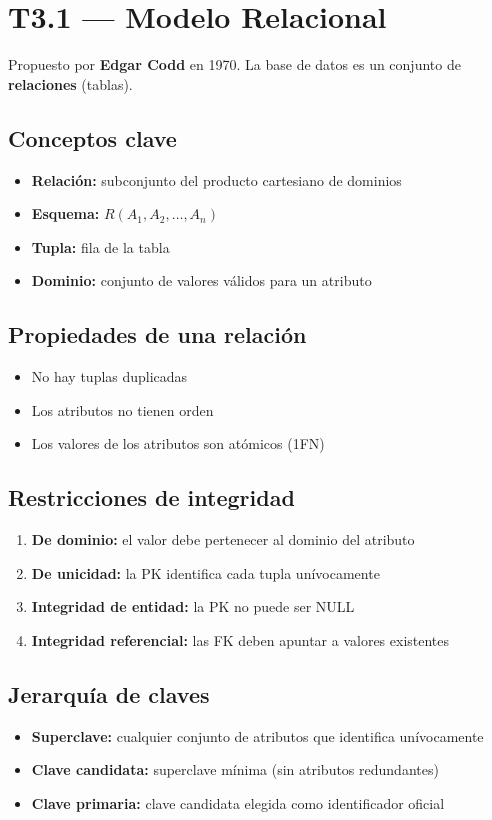 \documentclass[12pt, a4paper]{article}
\begin{document}
\section{T3.1 — Modelo Relacional}

Propuesto por \textbf{Edgar Codd} en 1970. La base de datos es un conjunto de \textbf{relaciones} (tablas).

\subsection{Conceptos clave}
\begin{itemize}
  \item \textbf{Relación:} subconjunto del producto cartesiano de dominios
  \item \textbf{Esquema:} $R(A_1, A_2, \ldots, A_n)$
  \item \textbf{Tupla:} fila de la tabla
  \item \textbf{Dominio:} conjunto de valores válidos para un atributo
\end{itemize}

\subsection{Propiedades de una relación}
\begin{itemize}
  \item No hay tuplas duplicadas
  \item Los atributos no tienen orden
  \item Los valores de los atributos son atómicos (1FN)
\end{itemize}

\subsection{Restricciones de integridad}
\begin{enumerate}
  \item \textbf{De dominio:} el valor debe pertenecer al dominio del atributo
  \item \textbf{De unicidad:} la PK identifica cada tupla unívocamente
  \item \textbf{Integridad de entidad:} la PK no puede ser NULL
  \item \textbf{Integridad referencial:} las FK deben apuntar a valores existentes
\end{enumerate}

\subsection{Jerarquía de claves}
\begin{itemize}
  \item \textbf{Superclave:} cualquier conjunto de atributos que identifica unívocamente
  \item \textbf{Clave candidata:} superclave mínima (sin atributos redundantes)
  \item \textbf{Clave primaria:} clave candidata elegida como identificador oficial
\end{itemize}
\end{document}
